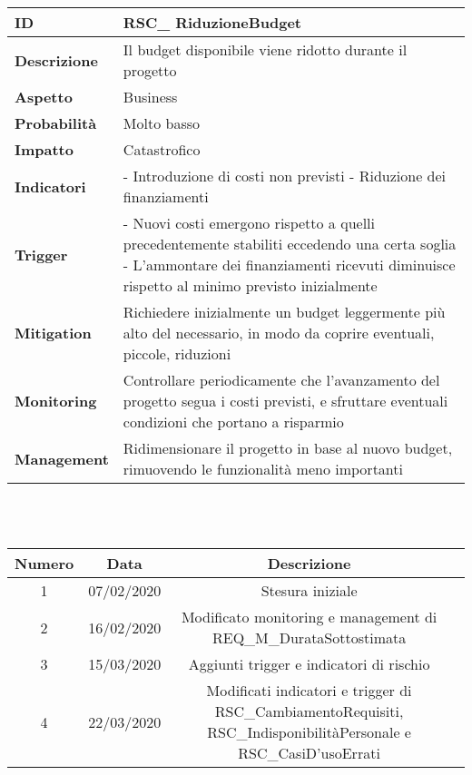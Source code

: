 \begin{tabular}{|p{2.2cm}|p{9.6cm}| }
 	\hline
	\textbf{ID} & RSC\_ RiduzioneBudget\\ [0.5ex] 
	\hline
	\textbf{Descrizione} & Il budget disponibile viene ridotto durante il progetto\\ 
	\hline
	\textbf{Aspetto} &  Business\\
	\hline
	\textbf{Probabilità} & Molto basso\\ 
	\hline
	\textbf{Impatto} & Catastrofico\\
	\hline
	\textbf{Indicatori} & - Introduzione di costi non previsti \newline
						  - Riduzione dei finanziamenti\\
	\hline
	\textbf{Trigger} & - Nuovi costi emergono rispetto a quelli precedentemente stabiliti eccedendo una certa soglia\newline
					   - L'ammontare dei finanziamenti ricevuti diminuisce rispetto al minimo previsto inizialmente\\
	\hline
	\textbf{Mitigation} & Richiedere inizialmente un budget leggermente più alto del necessario, in modo da coprire eventuali, piccole, riduzioni\\
	\hline
	\textbf{Monitoring} & Controllare periodicamente che l'avanzamento del progetto segua i costi previsti, e sfruttare eventuali condizioni che portano a risparmio\\ 
	\hline
	\textbf{Management} & Ridimensionare il progetto in base al nuovo budget, rimuovendo le funzionalità meno importanti\\ 
	\hline
\end{tabular}

\renewcommand\theadfont{}

\newpage
{} \\ \\
\begin{tabular}{|c | c | c | c|} 
 	\hline
	 Numero & Data & Descrizione \\ [0.5ex] 
	\hline\hline
	1 & 07/02/2020 & Stesura iniziale \\ 
	\hline
	2 & 16/02/2020 & Modificato monitoring e management di REQ\_M\_DurataSottostimata \\
	\hline
	3 & 15/03/2020 & Aggiunti trigger e indicatori di rischio \\
	\hline
	4 & 22/03/2020 & \thead{Modificati indicatori e trigger di RSC\_CambiamentoRequisiti, \\RSC\_IndisponibilitàPersonale e RSC\_CasiD'usoErrati}\\
	\hline
\end{tabular}